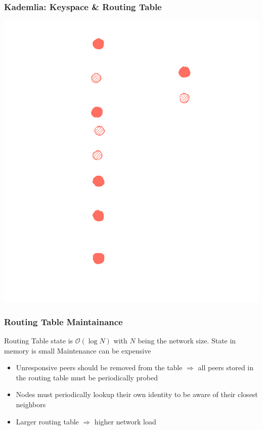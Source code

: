 \documentclass{../shipyard-slide}
\begin{document}
\begin{frame}
\frametitle{Kademlia: Keyspace \& Routing Table}

\hspace{4cm}\includegraphics[scale=.13]{resources/rt0-2.png}
\end{frame}


\begin{frame}
\frametitle{Routing Table Maintainance}

\begin{itemize}
	\itemc Routing Table state is $\mathcal{O}(\log{N})$ with $N$ being the network size.
	\itemc State in memory is small
	\itemc Maintenance can be expensive
	\begin{itemize}
		\item[\greencube] Unresponsive peers should be removed from the table $\Rightarrow$ all peers stored in the routing table must be periodically probed
		\item[\greencube] Nodes must periodically lookup their own identity to be aware of their closest neighbors\\
		\item[\greencube] Larger routing table $\Rightarrow$ higher network load
	\end{itemize}
\end{itemize}
\end{frame}
\end{document}
